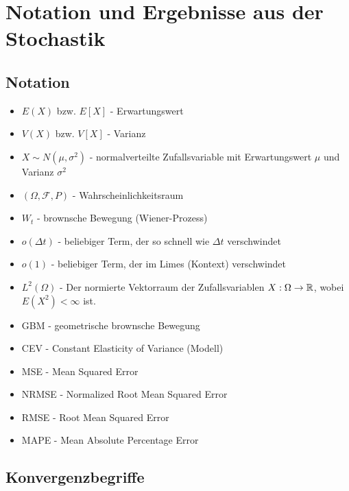 \section{Notation und Ergebnisse aus der Stochastik}
\subsection{Notation}
\begin{itemize}
    \item $E(X)$ bzw. $E[X]$ - Erwartungswert
    \item $V(X)$ bzw. $V[X]$ - Varianz
    \item $X \sim N(\mu, \sigma^2)$ - normalverteilte Zufallsvariable mit Erwartungswert $\mu$ und Varianz $\sigma^2$
    \item $(\Omega, \mathcal F, P)$ - Wahrscheinlichkeitsraum
    \item $W_t$ - brownsche Bewegung (Wiener-Prozess)
    \item $o(\Delta t)$ - beliebiger Term, der so schnell wie $\Delta t$ verschwindet
    \item $o(1)$ - beliebiger Term, der im Limes (Kontext) verschwindet
    \item $L^2(\Omega)$ - Der normierte Vektorraum der Zufallsvariablen $X : \Omega \to \Bbb R$, wobei $E(X^2) \lt \infty$ ist.
    \item GBM - geometrische brownsche Bewegung
    \item CEV - Constant Elasticity of Variance (Modell)
    \item MSE - Mean Squared Error
    \item NRMSE - Normalized Root Mean Squared Error
    \item RMSE - Root Mean Squared Error
    \item MAPE - Mean Absolute Percentage Error
\end{itemize}

\subsection{Konvergenzbegriffe}

